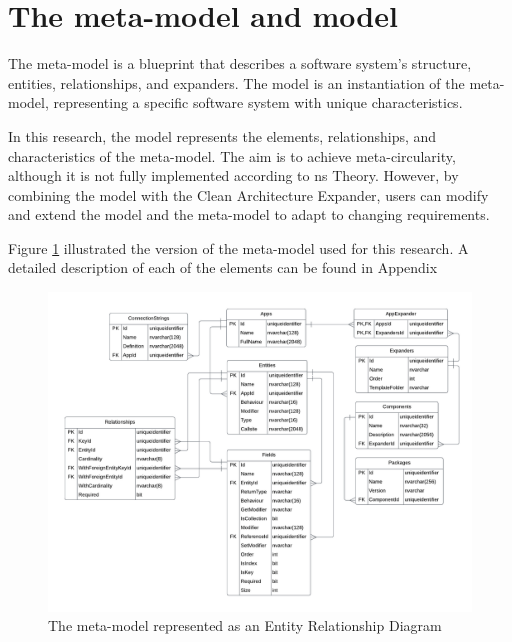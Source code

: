 \section{The meta-model and model} \label{sec_artifact_meta_model}

The meta-model is a blueprint that describes a software system's structure, entities,
relationships, and expanders. The model is an instantiation of the meta-model,
representing a specific software system with unique characteristics.

In this research, the model represents the elements, relationships, and characteristics of
the meta-model. The aim is to achieve meta-circularity, although it is not fully
implemented according to \gls{ns} Theory. However, by combining the model with the Clean
Architecture Expander, users can modify and extend the model and the meta-model to adapt
to changing requirements. 

Figure \ref{fig_erd} illustrated the version of the meta-model used for this research. A
detailed description of each of the elements can be found in Appendix

\begin{figure}[H]
    \centering
    \includegraphics[width=1\textwidth]{figures/erd.pdf}
    \caption[The meta-model represented as an Entity Relationship Diagram]{The meta-model represented as an Entity Relationship Diagram}
    \label{fig_erd}
\end{figure}